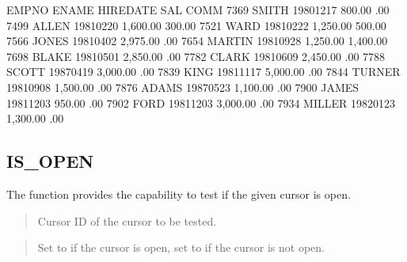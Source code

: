 \documentclass[letterpaper,10pt,english,openany,oneside]{sphinxmanual}
\begin{document}
\begin{sphinxVerbatim}[commandchars=\\\{\}]
EMPNO  ENAME       HIREDATE    SAL       COMM
\PYGZhy{}\PYGZhy{}\PYGZhy{}\PYGZhy{}\PYGZhy{}  \PYGZhy{}\PYGZhy{}\PYGZhy{}\PYGZhy{}\PYGZhy{}\PYGZhy{}\PYGZhy{}\PYGZhy{}\PYGZhy{}\PYGZhy{}  \PYGZhy{}\PYGZhy{}\PYGZhy{}\PYGZhy{}\PYGZhy{}\PYGZhy{}\PYGZhy{}\PYGZhy{}\PYGZhy{}\PYGZhy{}  \PYGZhy{}\PYGZhy{}\PYGZhy{}\PYGZhy{}\PYGZhy{}\PYGZhy{}\PYGZhy{}\PYGZhy{}  \PYGZhy{}\PYGZhy{}\PYGZhy{}\PYGZhy{}\PYGZhy{}\PYGZhy{}\PYGZhy{}\PYGZhy{}
7369   SMITH       1980\PYGZhy{}12\PYGZhy{}17    800.00       .00
7499   ALLEN       1981\PYGZhy{}02\PYGZhy{}20  1,600.00    300.00
7521   WARD        1981\PYGZhy{}02\PYGZhy{}22  1,250.00    500.00
7566   JONES       1981\PYGZhy{}04\PYGZhy{}02  2,975.00       .00
7654   MARTIN      1981\PYGZhy{}09\PYGZhy{}28  1,250.00  1,400.00
7698   BLAKE       1981\PYGZhy{}05\PYGZhy{}01  2,850.00       .00
7782   CLARK       1981\PYGZhy{}06\PYGZhy{}09  2,450.00       .00
7788   SCOTT       1987\PYGZhy{}04\PYGZhy{}19  3,000.00       .00
7839   KING        1981\PYGZhy{}11\PYGZhy{}17  5,000.00       .00
7844   TURNER      1981\PYGZhy{}09\PYGZhy{}08  1,500.00       .00
7876   ADAMS       1987\PYGZhy{}05\PYGZhy{}23  1,100.00       .00
7900   JAMES       1981\PYGZhy{}12\PYGZhy{}03    950.00       .00
7902   FORD        1981\PYGZhy{}12\PYGZhy{}03  3,000.00       .00
7934   MILLER      1982\PYGZhy{}01\PYGZhy{}23  1,300.00       .00
\end{sphinxVerbatim}

\newpage


\subsection{IS\_OPEN}
\label{\detokenize{is_open::doc}}\label{\detokenize{is_open:is-open}}
The  function provides the capability to test if the given
cursor is open.
\begin{quote}

\end{quote}


\begin{quote}

Cursor ID of the cursor to be tested.
\end{quote}

\begin{quote}

Set to  if the cursor is open, set to  if the cursor is not
open.
\end{quote}
\end{document}
